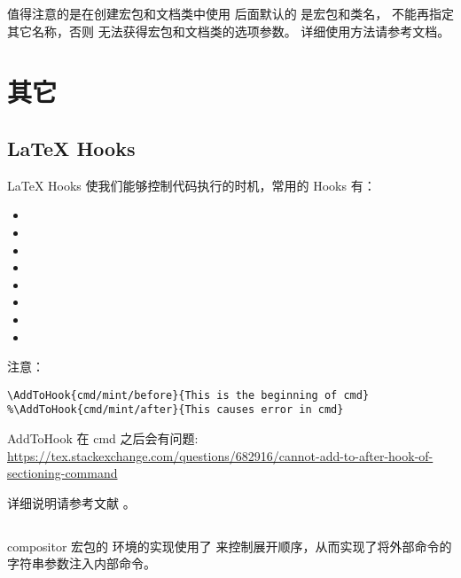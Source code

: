 值得注意的是在创建宏包和文档类中使用  后面默认的 是宏包和类名，
不能再指定其它名称，否则  无法获得宏包和文档类的选项参数。
详细使用方法请参考文档。

\section{其它}

\subsection{{\LaTeX} Hooks}

{\LaTeX} Hooks 使我们能够控制代码执行的时机，常用的 Hooks 有：

\begin{itemize}
  \item {}
  \item {}
  \item {}
  \item {}
  \item {}
  \item {}
  \item {}
  \item {}
\end{itemize}

注意：
\begin{verbatim}
\AddToHook{cmd/mint/before}{This is the beginning of cmd}
%\AddToHook{cmd/mint/after}{This causes error in cmd}
\end{verbatim}

AddToHook 在 cmd 之后会有问题: \url{https://tex.stackexchange.com/questions/682916/cannot-add-to-after-hook-of-sectioning-command}

详细说明请参考文献 \cite{HOOKS}。

\subsection{\protect{}}

compositor 宏包的  环境的实现使用了
 来控制展开顺序，从而实现了将外部命令的字符串参数注入内部命令。

\section{\protect{}}

